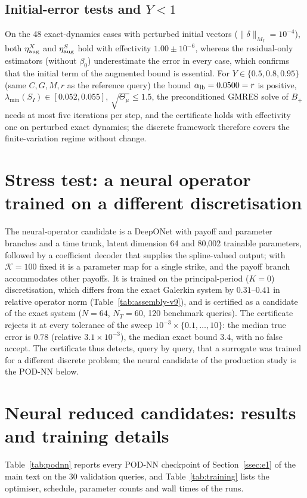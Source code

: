 \documentclass[supplement,hidelinks]{siamart251216}
\newcommand{\rf}{r}
\newcommand{\Thmu}{\Theta_\mu}
\begin{document}
\subsection{Initial-error tests and \texorpdfstring{$Y<1$}{Y<1}}
On the 48 exact-dynamics cases with perturbed initial vectors ($\|\delta\|_{M_I}=10^{-4}$), both
$\eta^X_{\rm aug}$ and $\eta^S_{\rm aug}$ hold with effectivity $1.00\pm10^{-6}$, whereas the
residual-only estimators (without $\beta_0$) underestimate the error in every case, which confirms
that the initial term of the augmented bound is essential.  For $Y\in\{0.5,0.8,0.95\}$
(same $C,G,M,\rf$ as the reference query) the bound $\alpha_{\rm lb}=0.0500=\rf$ is positive,
$\lambda_{\min}(S_I)\in[0.052,0.055]$, $\sqrt{\Thmu}\le1.5$, the preconditioned GMRES solve of
$B_+$ needs at most five iterations per step, and the certificate holds with effectivity one on
perturbed exact dynamics; the discrete framework therefore covers the finite-variation regime
without change.
\section{Stress test: a neural operator trained on a different discretisation}
\label{sm:deeponet}
The neural-operator candidate is a DeepONet with payoff and parameter branches and a time
trunk, latent dimension 64 and 80,002 trainable parameters, followed by a coefficient decoder
that supplies the spline-valued output; with $\mathcal K=100$ fixed it is a parameter map for a
single strike, and the payoff branch accommodates other payoffs.  It is trained on the
principal-period ($K=0$) discretisation, which differs from the exact Galerkin system by
$0.31$--$0.41$ in relative operator norm (Table~\ref{tab:assembly-v9}), and is certified as a
candidate of the exact system ($N=64$, $N_T=60$, 120 benchmark queries).  The certificate rejects it
at every tolerance of the sweep $10^{-3}\times\{0.1,\dots,10\}$: the median true error is $0.78$
(relative $3.1\times10^{-3}$), the median exact bound $3.4$, with no false accept.  The certificate
thus detects, query by query, that a surrogate was trained for a different discrete problem; the
neural candidate of the production study is the POD-NN below.
\section{Neural reduced candidates: results and training details}
\label{sm:training}
Table~\ref{tab:podnn} reports every POD-NN checkpoint of Section~\ref{ssec:e1} of the main text on
the 30 validation queries, and Table~\ref{tab:training} lists the optimiser, schedule, parameter
counts and wall times of the runs.


\end{document}
